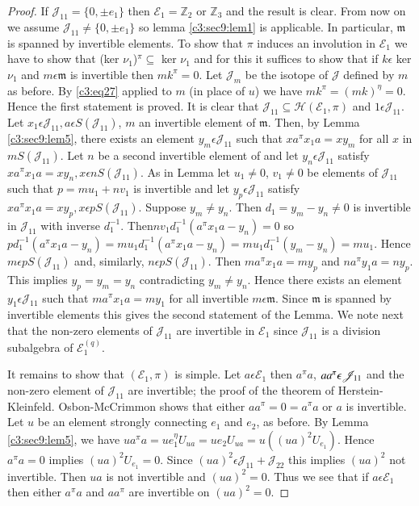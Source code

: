 \begin{proof}
If $\mathscr{J}_{11}=\{0,\pm e_1\}$ then $\mathcal{E}_1=\mathbb{Z}_2$
or $\mathbb{Z}_3$ and the result is clear. From now on we assume
$\mathscr{J}_{11}\neq \{0, \pm e_1\}$ so lemma \ref{c3:sec9:lem1} is applicable. In
particular, $\mathfrak{m}$ is spanned by invertible elements. To show
that $\pi$ induces an involution in $\mathcal{E}_1$ we have to show
that (ker $\nu_1$)$^{\pi}\subseteq$ ker $\nu_1$ and for this it
suffices to show that if $k\epsilon$ ker $\nu_1$ and $m\epsilon
\mathfrak{m}$ is invertible then $mk^{\pi}=0$. Let $\mathscr{J}_m$ be
the isotope of $\mathscr{J}$ defined by $m$ as before. By \eqref{c3:eq27}
applied to $m$ (in place of $u$) we have
$mk^{\pi}=(mk)^{\eta}=0$. Hence the first statement is proved. It is
clear that $\mathscr{J}_{11}\subseteq \mathscr{H}(\mathcal{E}_1,\pi)$
and $1\epsilon \mathscr{J}_{11}$. Let $x_1\epsilon
\mathscr{J}_{11},a\epsilon S(\mathscr{J}_{11})$, $m$ an invertible
element of $\mathfrak{m}$. Then, by Lemma \ref{c3:sec9:lem5}, there
exists an element 
$y_m\epsilon \mathscr{J}_{11}$ such that $xa^{\pi}x_1a=xy_m$ for all
$x$ in $mS(\mathscr{J}_{11})$. Let $n$ be a second invertible element
of and let $y_n\epsilon \mathscr{J}_{11}$ satisfy
$xa^{\pi}x_1a=xy_n,x\epsilon n S(\mathscr{J}_{11})$. As in Lemma let
$u_1\neq 0$, $v_1\neq 0$ be elements of $\mathscr{J}_{11}$ such that
$p=mu_1+nv_1$ is invertible and let $y_p\epsilon \mathscr{J}_{11}$
satisfy $xa^{\pi} x_1a=xy_p, x\epsilon p S(\mathscr{J}_{11})$. Suppose
$y_m\neq y_n$. Then $d_1=y_m-y_n\neq 0$ is invertible in
$\mathscr{J}_{11}$ with inverse $d^{-1}_1$. Then\pageoriginale $n
v_1d^{-1}_1(a^{\pi}x_1a-y_n)=0$ so
$pd^{-1}_1(a^{\pi}x_1a-y_n)=mu_1d^{-1}_1(a^{\pi}x_1a-y_n)=mu_1d^{-1}_1(y_m-y_n)=mu_1$. Hence
$m\epsilon pS(\mathscr{J}_{11})$ and, similarly, $n\epsilon
pS(\mathscr{J}_{11})$. Then $ma^{\pi}x_1a=my_p$ and $na^{\pi}y_1a=
ny_p$. This implies $y_p=y_m=y_n$ contradicting $y_m\neq y_n$. Hence
there exists an element $y_1\epsilon \mathscr{J}_{11}$ such that
$ma^{\pi}x_1a=my_1$ for all invertible $m\epsilon \mathfrak{m}$. Since
$\mathfrak{m}$ is spanned by invertible elements this gives the second
statement of the Lemma. We note next that the non-zero elements of
$\mathscr{J}_{11}$ are invertible in $\mathcal{E}_1$ since
$\mathscr{J}_{11}$ is a division subalgebra of
$\mathcal{E}_{1}^{(q)}$.

It remains to show that $(\mathcal{E}_1,\pi)$ is simple. Let
$a\epsilon \mathcal{E}_1$ then $a^{\pi} a$, $aa^{\pi}\epsilon\break
\mathscr{J}_{11}$ and the non-zero element of $\mathscr{J}_{11}$ are
invertible; the proof of the theorem of
Herstein-Kleinfeld. Osbon-McCrimmon shows that either
$aa^{\pi}=0=a^{\pi}a$ or $a$ is invertible. Let $u$ be an element
strongly connecting $e_1$ and $e_2$, as before. By Lemma \ref{c3:sec9:lem5}, we have
$ua^{\pi}a=ue_1^{\eta}U_{ua}=ue_2U_{ua}=u((ua)^{2}U_{e_1})$. Hence
$a^{\pi}a=0$ implies $(ua)^{2}U_{e_1}=0$. Since $(ua)^{2}\epsilon
\mathscr{J}_{11}+\mathscr{J}_{22}$ this implies $(ua)^{2}$ not
invertible. Then $ua$ is not invertible and $(ua)^{2}=0$. Thus we see
that if $a\epsilon \mathcal{E}_1$ then either $a^{\pi}a$ and
$aa^{\pi}$ are invertible on $(ua)^{2}=0$.


\end{proof}
